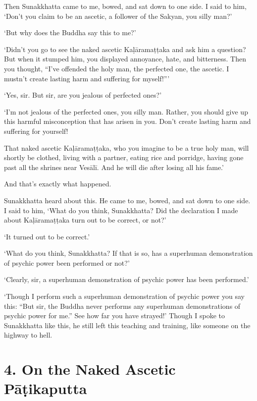 \documentclass[12pt,openany]{book}%
\begin{document}
Then Sunakkhatta came to me, bowed, and sat down to one side. I said to him, ‘Don’t you claim to be an ascetic, a follower of the Sakyan, you silly man?’ 

‘But why does the Buddha say this to me?’ 

‘Didn’t you go to see the naked ascetic \textsanskrit{Kaḷāramaṭṭaka} and ask him a question? But when it stumped him, you displayed annoyance, hate, and bitterness. Then you thought, “I’ve offended the holy man, the perfected one, the ascetic. I mustn’t create lasting harm and suffering for myself!”’ 

‘Yes, sir. But sir, are you jealous of perfected ones?’ 

‘I’m not jealous of the perfected ones, you silly man. Rather, you should give up this harmful misconception that has arisen in you. Don’t create lasting harm and suffering for yourself! 

That naked ascetic \textsanskrit{Kaḷāramaṭṭaka}, who you imagine to be a true holy man, will shortly be clothed, living with a partner, eating rice and porridge, having gone past all the shrines near \textsanskrit{Vesālī}. And he will die after losing all his fame.’ 

And that’s exactly what happened. 

Sunakkhatta heard about this. He came to me, bowed, and sat down to one side. I said to him, ‘What do you think, Sunakkhatta? Did the declaration I made about \textsanskrit{Kaḷāramaṭṭaka} turn out to be correct, or not?’ 

‘It turned out to be correct.’ 

‘What do you think, Sunakkhatta? If that is so, has a superhuman demonstration of psychic power been performed or not?’ 

‘Clearly, sir, a superhuman demonstration of psychic power has been performed.’ 

‘Though I perform such a superhuman demonstration of psychic power you say this: “But sir, the Buddha never performs any superhuman demonstrations of psychic power for me.” See how far you have strayed!’ Though I spoke to Sunakkhatta like this, he still left this teaching and training, like someone on the highway to hell. 

\section*{4. On the Naked Ascetic \textsanskrit{Pāṭikaputta} }
\end{document}
